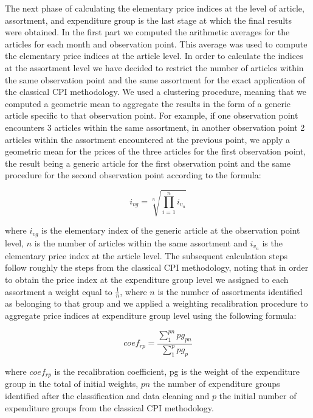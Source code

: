 \documentclass[]{article}
\begin{document}
The next phase of calculating the elementary price indices at the level of article, assortment, and expenditure group 
is the last stage at which the final results were obtained. In the first part we computed the arithmetic 
averages for the articles for each month and observation point. This average was used to compute the elementary 
price indices at the article level. In order to calculate the indices at the assortment level we have decided to 
restrict the number of articles within the same observation point and the same assortment for the exact application 
of the classical CPI methodology. We used a clustering procedure, meaning that we computed a geometric mean to 
aggregate the results in the form of a generic article specific to that observation point. For example, if one 
observation point encounters 3 articles within the same assortment, in another observation point 2 articles 
within the assortment encountered at the previous point, we apply a geometric mean for the prices of the three 
articles for the first observation point, the result being a generic article for the first observation point and the 
same procedure for the second observation point according to the formula:


\begin{equation}\label{eq:1}
i_{vg} = \sqrt[n]{\prod_{i=1}^{n} i_{v_{n}}}
\end{equation}


where $i_{vg}$ is the elementary index of the generic article at the observation point level, $n$ is the number of 
articles within the same assortment and $i_{v_{n}}$ is the elementary price index at the article level. 
The subsequent calculation steps follow roughly the steps from the classical CPI methodology, noting that in order 
to obtain the price index at the expenditure group level we assigned to each assortment a weight equal to $\frac{1}{n}$,
where $n$ is the number of assortments identified as belonging to that group and we applied a weighting 
recalibration procedure to aggregate price indices at expenditure group level using the following formula:


\begin{equation}\label{eq:2}
coef_{rp} = \frac{\sum_1^{pn}{pg_{pn}}}{\sum_1^p{pg_{p}}}
\end{equation}


where $coef_{rp}$  is the recalibration coefficient, pg is the weight of the expenditure group in the total of 
initial weights, $pn$ the number of expenditure groups identified after the classification and data cleaning 
and $p$ the initial number of expenditure groups from the classical CPI methodology.
\end{document}
